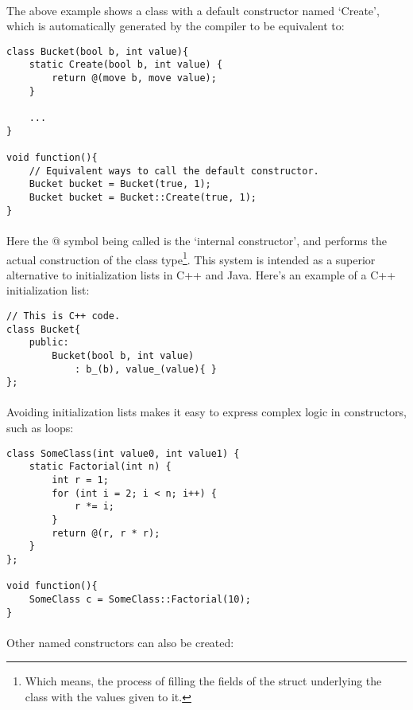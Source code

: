 \documentclass[12pt,twoside,notitlepage]{report}
\begin{document}
\paragraph{}
The above example shows a class with a default constructor named `Create', which is automatically generated by the compiler to be equivalent to:
 
\begin{lstlisting}
class Bucket(bool b, int value){
	static Create(bool b, int value) {
		return @(move b, move value);
	}

	...
}

void function(){
	// Equivalent ways to call the default constructor.
	Bucket bucket = Bucket(true, 1);
	Bucket bucket = Bucket::Create(true, 1);
}
\end{lstlisting}


\paragraph{}
Here the @ symbol being called is the `internal constructor', and performs the actual construction of the class type\footnote{Which means, the process of filling the fields of the struct underlying the class with the values given to it.}. This system is intended as a superior alternative to initialization lists in C++ and Java. Here's an example of a C++ initialization list:


\begin{lstlisting}
// This is C++ code.
class Bucket{
	public:
		Bucket(bool b, int value)
			: b_(b), value_(value){ }
};
\end{lstlisting}


\paragraph{}
Avoiding initialization lists makes it easy to express complex logic in constructors, such as loops:


\begin{lstlisting}
class SomeClass(int value0, int value1) {
	static Factorial(int n) {
		int r = 1;
		for (int i = 2; i < n; i++) {
			r *= i;
		}
		return @(r, r * r);
	}
};

void function(){
	SomeClass c = SomeClass::Factorial(10);
}
\end{lstlisting}


\paragraph{}
Other named constructors can also be created:
\end{document}
